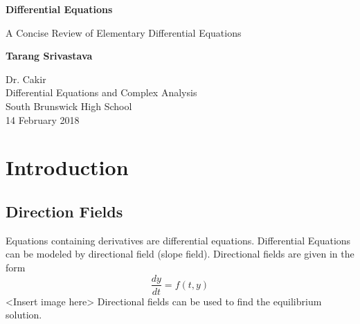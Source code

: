 \documentclass[11pt]{article}
\author{Tarang Srivastava}
\theoremstyle{definition}
\theoremstyle{definition}
\begin{document}
	\begin{titlepage}
	    	\begin{center}
		        \vspace*{1cm}
		        \Huge
		        \textbf{Differential Equations}
		      		
		        \vspace{0.5cm}
		        \LARGE
		        A Concise Review of Elementary Differential Equations
		        
		        \vspace{1.5cm}
		        
		        \textbf{Tarang Srivastava}
		        
		        \vfill
		        
		        \vspace{0.8cm}
		        
		        
		        \Large
		        Dr. Cakir\\
		        Differential Equations and Complex Analysis\\
		        South Brunswick High School\\
		        14 February 2018
	        
	    \end{center}
	\end{titlepage}
	\tableofcontents	
	\pagebreak
	
	\section{Introduction}
		\subsection{Direction Fields}	
			Equations containing derivatives are differential equations. Differential Equations can be modeled by directional field (slope field). Directional fields are given in the form 
			$$\dfrac{dy}{dt} = f(t,y)$$
			<Insert image here> 
			Directional fields can be used to find the equilibrium solution. 
\end{document}
